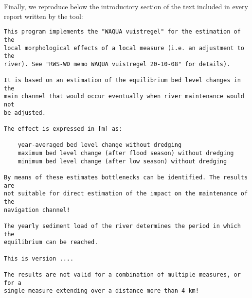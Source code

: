 Finally, we reproduce below the introductory section of the text included in every report written by the tool:

\begin{Verbatim}[frame=single, framesep=5pt]
This program implements the "WAQUA vuistregel" for the estimation of the
local morphological effects of a local measure (i.e. an adjustment to the
river). See "RWS-WD memo WAQUA vuistregel 20-10-08" for details).

It is based on an estimation of the equilibrium bed level changes in the
main channel that would occur eventually when river maintenance would not
be adjusted.

The effect is expressed in [m] as:

    year-averaged bed level change without dredging
    maximum bed level change (after flood season) without dredging
    minimum bed level change (after low season) without dredging

By means of these estimates bottlenecks can be identified. The results are
not suitable for direct estimation of the impact on the maintenance of the
navigation channel!

The yearly sediment load of the river determines the period in which the
equilibrium can be reached.

This is version ....

The results are not valid for a combination of multiple measures, or for a
single measure extending over a distance more than 4 km!
\end{Verbatim}
